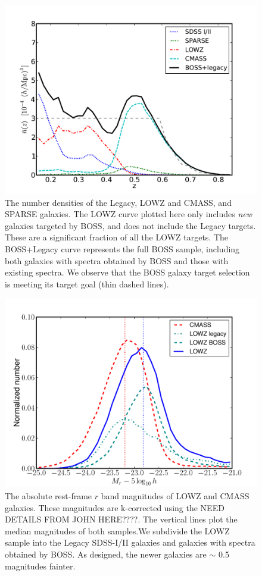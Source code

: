 \documentclass[preprint]{aastex}
\begin{document}
\begin{figure}
\includegraphics[width=0.95\columnwidth]{plots/nbarz-40-chunk6-21-CMASS_LOWZ_SPARSE}
\caption{The number densities of the Legacy, LOWZ and CMASS, and SPARSE 
galaxies. The LOWZ curve plotted here only includes {\it new} galaxies targeted
by BOSS, and does not include the Legacy targets. These are a
significant fraction of all the LOWZ targets. The BOSS+Legacy curve represents
the full BOSS sample, including both galaxies with spectra obtained by BOSS and
those with existing spectra. We observe that the BOSS galaxy target selection is
meeting its target goal (thin dashed lines).}
\label{fig:nbar}
\end{figure}

\begin{figure}
\includegraphics[width=0.95\columnwidth]{plots/LOWZ-r_absmag}
\caption{The absolute rest-frame $r$ band magnitudes of LOWZ and CMASS
galaxies. These magnitudes are k-corrected using the NEED DETAILS FROM JOHN
HERE????. The vertical lines plot the median magnitudes of both samples.We
subdivide the LOWZ sample into the Legacy SDSS-I/II galaxies and galaxies with spectra 
obtained by BOSS. As designed, the newer galaxies are
$\sim$ 0.5 magnitudes fainter.}
\label{fig:absmag}
\end{figure}
\end{document}
